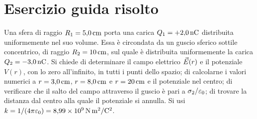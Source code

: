 \documentclass[11pt,a4paper]{article}
\begin{document}
\section*{Esercizio guida risolto}

Una sfera di raggio $R_1=5{,}0\,\mathrm{cm}$ porta una carica $Q_1=+2{,}0\,\mathrm{nC}$ distribuita uniformemente nel suo volume. Essa è circondata da un guscio sferico sottile concentrico, di raggio $R_2=10\,\mathrm{cm}$, sul quale è distribuita uniformemente la carica $Q_2=-3{,}0\,\mathrm{nC}$. Si chiede di determinare il campo elettrico $\vec{E}(r)$ e il potenziale $V(r)$, con lo zero all'infinito, in tutti i punti dello spazio; di calcolarne i valori numerici a $r=3{,}0\,\mathrm{cm}$, $r=8{,}0\,\mathrm{cm}$ e $r=20\,\mathrm{cm}$ e il potenziale nel centro; di verificare che il salto del campo attraverso il guscio è pari a $\sigma_2/\varepsilon_0$; di trovare la distanza dal centro alla quale il potenziale si annulla. Si usi $k=1/(4\pi\varepsilon_0)=8{,}99\times10^9\,\mathrm{N\,m^2/C^2}$.
\end{document}
